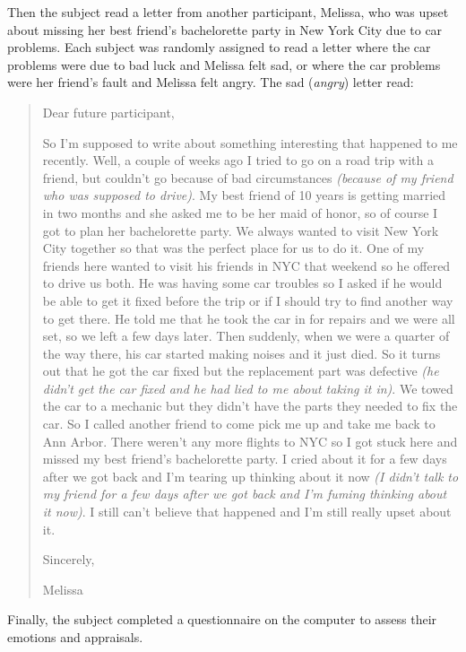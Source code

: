 \documentclass[man,a4paper,noextraspace,apacite]{apa6}
\begin{document}
Then the subject read a letter from another participant, Melissa, who was upset about missing her best friend's bachelorette party in New York City due to car problems. Each subject was randomly assigned to read a letter where the car problems were due to bad luck and Melissa felt sad, or where the car problems were her friend's fault and Melissa felt angry. The sad (\textit{angry}) letter read:

\begin{quote}
Dear future participant,

    So I'm supposed to write about something interesting that happened to me recently. Well, a couple of weeks ago I tried to go on a road trip with a friend, but couldn't go because of bad circumstances \textit{(because of my friend who was supposed to drive)}. My best friend of 10 years is getting married in two months and she asked me to be her maid of honor, so of course I got to plan her bachelorette party. We always wanted to visit New York City together so that was the perfect place for us to do it. One of my friends here wanted to visit his friends in NYC that weekend so he offered to drive us both. He was having some car troubles so I asked if he would be able to get it fixed before the trip or if I should try to find another way to get there. He told me that he took the car in for repairs and we were all set, so we left a few days later. Then suddenly, when we were a quarter of the way there, his car started making noises and it just died. So it turns out that he got the car fixed but the replacement part was defective \textit{(he didn't get the car fixed and he had lied to me about taking it in)}. We towed the car to a mechanic but they didn't have the parts they needed to fix the car. So I called another friend to come pick me up and take me back to Ann Arbor. There weren't any more flights to NYC so I got stuck here and missed my best friend's bachelorette party. I cried about it for a few days after we got back and I'm tearing up thinking about it now \textit{(I didn't talk to my friend for a few days after we got back and I'm fuming thinking about it now)}. I still can't believe that happened and I'm still really upset about it.

Sincerely,

Melissa

\end{quote}

Finally, the subject completed a questionnaire on the computer to assess their emotions and appraisals.
\end{document}
